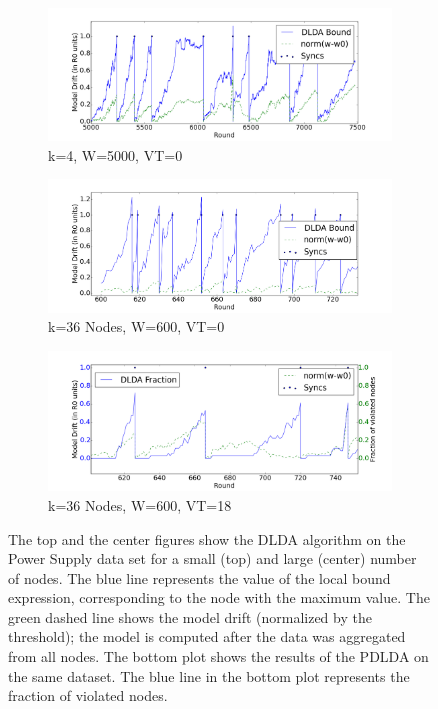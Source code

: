 \documentclass{vldb}
\begin{document}
\begin{figure}[ht!]
    \centering
    \begin{subfigure}[b]{0.5\textwidth}
        \includegraphics[width=\textwidth]{PowerSupply/4nodes.png}
        \caption{k=4, W=5000, VT=0}
    \end{subfigure}

    \begin{subfigure}[b]{0.5\textwidth}
        \includegraphics[width=\textwidth]{PowerSupply/36nodes.png}
        \caption{k=36 Nodes, W=600, VT=0}
    \end{subfigure}

    \begin{subfigure}[b]{0.5\textwidth}
        \includegraphics[width=\textwidth]{PowerSupply/36nodesProb.png}
        \caption{k=36 Nodes, W=600, VT=18}
    \end{subfigure}
    \caption{The top and the center figures show the DLDA algorithm on the Power Supply data set for a small (top) and large (center) number of nodes. The blue line represents the value of the local bound expression, corresponding to the node with the maximum value. The green dashed line shows the model drift (normalized by the threshold); the model is computed after the data was aggregated from all nodes. The bottom plot shows the results of the PDLDA on the same dataset. The blue line in the bottom plot represents the fraction of violated nodes.}\label{PowerSupplyFigures}
\end{figure}
\end{document}
